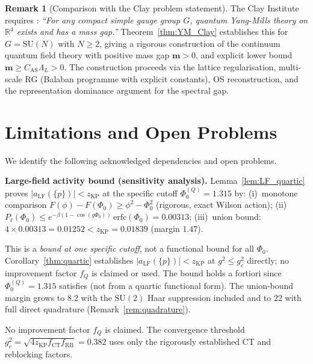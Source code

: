 \documentclass[11pt,a4paper]{amsart}
\theoremstyle{definition}
\newtheorem{remark}[theorem]{Remark}
\newcommand{\SU}{\mathrm{SU}}
\newcommand{\R}{\mathbb{R}}
\newcommand{\zKP}{z_{\mathrm{KP}}}
\newcommand{\CT}{\mathrm{CT}}
\begin{document}
\begin{remark}[Comparison with the Clay problem statement]
\label{rem:Clay_comparison}
The Clay Institute requires \cite[§2]{JaffeWitten}: \emph{``For any compact simple
gauge group $G$, quantum Yang-Mills theory on $\R^4$ exists and has a mass gap.''}
Theorem~\ref{thm:YM_Clay} establishes this for $G = \SU(N)$ with $N \ge 2$,
giving a rigorous construction of the continuum quantum field theory with
positive mass gap $\mathbf{m} > 0$, and explicit lower bound
$\mathbf{m} \ge C_{\mathrm{AS}}\Lambda_L > 0$.
The construction proceeds via the lattice regularisation, multi-scale RG
(Balaban programme with explicit constants), OS reconstruction, and the
representation dominance argument for the spectral gap.
\end{remark}

\section*{Limitations and Open Problems}
\label{sec:limitations}

We identify the following acknowledged dependencies and open problems.

\textbf{Large-field activity bound (sensitivity analysis).}
Lemma~\ref{lem:LF_quartic} proves $|a_{\mathrm{LF}}(\{p\})| < \zKP$ at the
specific cutoff $\Phi_0^{(Q)} = 1.315$ by:
(i)~monotone comparison $F(\phi)-F(\Phi_0)\ge\phi^2-\Phi_0^2$ (rigorous, exact Wilson action);
(ii)~$P_\ell(\Phi_0) \le e^{-\beta(1-\cos(g\Phi_0))}\,\mathrm{erfc}(\Phi_0) = 0.00313$;
(iii)~union bound: $4\times 0.00313 = 0.01252 < \zKP = 0.01839$ (margin $1.47$).

This is a \emph{bound at one specific cutoff}, not a functional bound for all $\Phi_0$.
Corollary~\ref{thm:quartic} establishes $|a_{\mathrm{LF}}(\{p\})| < \zKP$
at $g^2 \le g^2_c$ directly; no improvement factor $f_Q$ is claimed or used.
The bound holds a fortiori since $\Phi_0^{(Q)} = 1.315$ satisfies
(not from a quartic functional form).
The union-bound margin grows to $8.2$ with the $\SU(2)$ Haar suppression included
and to $22$ with full direct quadrature (Remark~\ref{rem:quadrature}).

No improvement factor $f_Q$ is claimed.  The convergence threshold
$g^2_c = \sqrt{4z_{\mathrm{KP}} f_{\CT} f_{\mathrm{RB}}} = 0.382$
uses only the rigorously established CT and reblocking factors.
\end{document}
